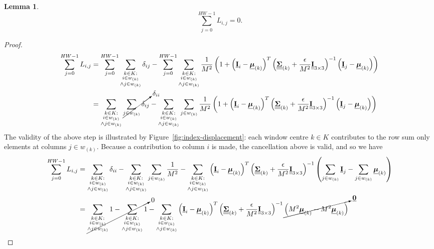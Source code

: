 \documentclass{article}
\theoremstyle{definition}
\newtheorem{lemma}[theorem]{Lemma}
\def\vt#1{\underline{\mathbf{#1}}}
\def\vts#1{\underline{\boldsymbol{#1}}}
\def\mt#1{\underline{\underline{\mathbf{#1}}}}
\def\mts#1{\underline{\underline{\boldsymbol{#1}}}}
\begin{document}
\begin{lemma}\label{lemma3}
    $$\sum_{j=0}^{HW-1} L_{i,j} = 0.$$
    \begin{proof}
        \begin{align*}
            \sum_{j=0}^{HW-1} L_{i,j} &= \sum_{j=0}^{HW-1} \sum_{\substack{k\in K:\\i\in w_{(k)}\\ \wedge j\in w_{(k)}}} \delta_{ij} - \sum_{j=0}^{HW-1} \sum_{\substack{k\in K:\\i\in w_{(k)}\\ \wedge j\in w_{(k)}}} \frac1{M^2} \left(1 + \left(\vt{I}_i - \vts \mu_{(k)}\right)^T \left(\mts \Sigma_{(k)} + \frac\epsilon{M^2} \mt{I}_{3\times 3}\right)^{-1} \left(\vt{I}_j - \vts
            \mu_{(k)}\right) \right)\\
            &= \sum_{\substack{k\in K:\\i\in w_{(k)}\\ \wedge j\in w_{(k)}}} \cancelto{\delta_{ii}}{\sum_{j\in w_{(k)}} \delta_{ij}} - \sum_{\substack{k\in K:\\i\in w_{(k)}\\ \wedge j\in w_{(k)}}} \sum_{j\in w_{(k)}} \frac1{M^2} \left(1 + \left(\vt{I}_i - \vts \mu_{(k)}\right)^T \left(\mts \Sigma_{(k)} + \frac\epsilon{M^2} \mt{I}_{3\times 3}\right)^{-1} \left(\vt{I}_j - \vts
            \mu_{(k)}\right) \right)
        \end{align*}
        The validity of the above step is illustrated by Figure~\ref{fig:index-displacement}: each window centre $k\in K$ contributes to the row sum only elements at columns $j\in w_{(k)}$. Because a contribution to column $i$ is made, the cancellation above is valid, and so we have
        \begin{align*}
            \sum_{j=0}^{HW-1} L_{i,j} &= \sum_{\substack{k\in K:\\i\in w_{(k)}\\ \wedge j\in w_{(k)}}} \delta_{ii} - \sum_{\substack{k\in K:\\i\in w_{(k)}\\ \wedge j\in w_{(k)}}} \sum_{j\in w_{(k)}} \frac1{M^2}  - \sum_{\substack{k\in K:\\i\in w_{(k)}\\ \wedge j\in w_{(k)}}} \left(\vt{I}_i - \vts \mu_{(k)}\right)^T \left(\mts \Sigma_{(k)} + \frac\epsilon{M^2} \mt{I}_{3\times 3}\right)^{-1}  \left(\sum_{j\in w_{(k)}} \vt{I}_j - \sum_{j\in w_{(k)}} \vts \mu_{(k)}\right)  \\
            &= \cancelto0{\sum_{\substack{k\in K:\\i\in w_{(k)}\\ \wedge j\in w_{(k)}}} 1 - \sum_{\substack{k\in K:\\i\in w_{(k)}\\ \wedge j\in w_{(k)}}} 1}  - \sum_{\substack{k\in K:\\i\in w_{(k)}\\ \wedge j\in w_{(k)}}} \left(\vt{I}_i - \vts \mu_{(k)}\right)^T \left(\mts \Sigma_{(k)} + \frac\epsilon{M^2} \mt{I}_{3\times 3}\right)^{-1}  \cancelto{\vt 0}{\left(M^2 \vts \mu_{(k)} - M^2 \vts \mu_{(k)}\right)}  \\

\end{align*}
\end{proof}
\end{lemma}
\end{document}

